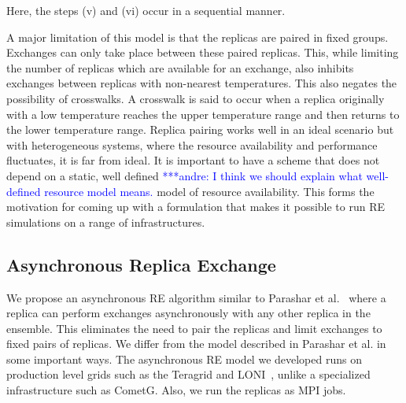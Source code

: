 \documentclass[a4paper,10pt]{article}
\newcommand{\jhanote}[1]{ {\textcolor{red} { ***shantenu: #1 }}}
\newcommand{\alnote}[1]{ {\textcolor{blue} { ***andre: #1 }}}
\newcommand{\alnote}[1]{}
\newcommand{\jhanote}[1]{}
\begin{document}
Here, the steps (v) and (vi) occur in a sequential manner.
 
A major limitation of this model is that the replicas are paired in fixed groups. 
Exchanges can only take place between these paired replicas.
This, while limiting the number of replicas which are available for an exchange, also inhibits exchanges between replicas with non-nearest temperatures. This also negates the possibility of crosswalks. A crosswalk is said to occur when a replica originally with a low temperature reaches the upper temperature range and then returns to the lower temperature range. %
Replica pairing works well in an ideal scenario but with heterogeneous systems, 
where the resource availability and performance fluctuates, it is far from ideal. It is 
important to have a scheme that does not depend on a static, well defined \alnote{I think we should explain what well-defined resource model means.}
model of resource availability. This forms the motivation for coming up 
with a formulation that makes it possible to run RE simulations on a range of infrastructures.
  

  
\subsection{Asynchronous Replica Exchange}

We propose an asynchronous RE algorithm similar to Parashar et al.~\cite{parashar_arepex}
where a replica can perform exchanges asynchronously with any other replica in the ensemble. This eliminates the need to pair the replicas and limit exchanges to fixed pairs of replicas. We differ from the model described in Parashar et al. in some important ways. The asynchronous RE model we developed runs on production level grids such as the Teragrid and LONI~\cite{LONI_web}, unlike a specialized infrastructure such as CometG. Also, we run the replicas as MPI jobs. 
\end{document}
